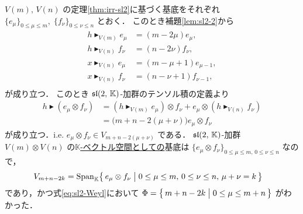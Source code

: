 \documentclass{ltjsarticle}
\theoremstyle{mystyle} %
\numberwithin{equation}{section}
\newcommand{\btr}{\blacktriangleright}
\begin{document}
$V(m),\, V(n)$ の定理\ref{thm:irr-sl2}に基づく基底をそれぞれ $\{e_\mu\}_{0 \le \mu \le m},\; \{f_\nu\}_{0 \le \nu \le n}$ とおく．
このとき補題\ref{lem:sl2-2}から
\begin{align}
    h \btr_{V(m)} e_\mu &= (m - 2\mu)e_\mu, \\
    h \btr_{V(n)} f_\nu &= (n - 2\nu)f_\nu, \\
    x \btr_{V(n)} e_{\mu} &= (m - \mu + 1)e_{\mu-1}, \\
    x \btr_{V(n)} f_\nu &= (n - \nu + 1)f_{\nu-1}, \\
\end{align}
が成り立つ．
このとき $\mathfrak{sl}(2,\, \mathbb{K})$-加群のテンソル積の定義より
\begin{align}
    h \btr (e_\mu \otimes f_\nu) &= ( h \btr_{V(m)} e_\mu) \otimes f_\nu + e_\mu \otimes ( h \btr_{V(n)} f_\nu) \\
    &= \bigl(m+n - 2(\mu + \nu)\bigr) e_\mu \otimes f_\nu
\end{align}
が成り立つ．i.e. $e_\mu \otimes f_\nu \in V_{m+n-2(\mu+\nu)}$ である． 
$\mathfrak{sl}(2,\, \mathbb{K})$-加群 $V(m) \otimes V(n)$ の\underline{$\mathbb{K}$-ベクトル空間としての}基底は $\{e_\mu \otimes f_\nu\}_{0 \le \mu \le m,\, 0 \le \nu \le n}$ なので，
\begin{align}
    V_{m+n-2k} 
    &= \operatorname{Span}_{\mathbb{K}} \bigl\{\, e_\mu \otimes f_{\nu} \bigm| 0 \le \mu \le m,\, 0 \le \nu \le n,\, \mu + \nu = k \,\bigr\}
\end{align}
であり，かつ式\eqref{eq:sl2-Weyl}において $\Phi = \bigl\{\, m+n-2k \bigm| 0 \le \mu \le m+n\,\bigr\}$ がわかった．
\end{document}
